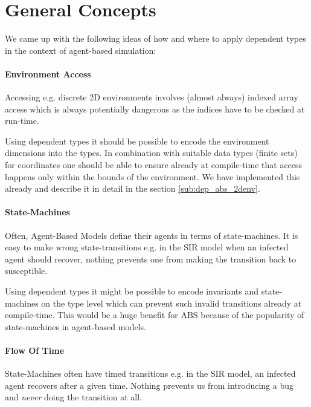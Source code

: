 \section{General Concepts}
\label{sec:dep_abs_generalconcepts}

We came up with the following ideas of how and where to apply dependent types in the context of agent-based simulation:



\paragraph{Environment Access}
Accessing e.g. discrete 2D environments involves (almost always) indexed array access which is always potentially dangerous as the indices have to be checked at run-time.

Using dependent types it should be possible to encode the environment dimensions into the types. In combination with suitable data types (finite sets) for coordinates one should be able to ensure already at compile-time that access happens only within the bounds of the environment. We have implemented this already and describe it in detail in the section \ref{sub:dep_abs_2denv}.

\paragraph{State-Machines}
Often, Agent-Based Models define their agents in terms of state-machines. It is easy to make wrong state-transitions e.g. in the SIR model when an infected agent should recover, nothing prevents one from making the transition back to susceptible. 

Using dependent types it might be possible to encode invariants and state-machines on the type level which can prevent such invalid transitions already at compile-time. This would be a huge benefit for ABS because of the popularity of state-machines in agent-based models.

\paragraph{Flow Of Time}
State-Machines often have timed transitions e.g. in the SIR model, an infected agent recovers after a given time. Nothing prevents us from introducing a bug and \textit{never} doing the transition at all.


